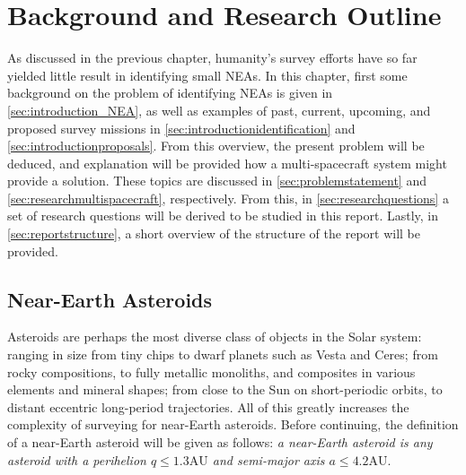 \chapter{Background and Research Outline}
As discussed in the previous chapter, humanity's survey efforts have so far yielded little result in identifying small NEAs. In this chapter, first some background on the problem of identifying NEAs is given in \autoref{sec:introduction_NEA}, as well as examples of past, current, upcoming, and proposed survey missions in \autoref{sec:introductionidentification} and \autoref{sec:introductionproposals}. From this overview, the present problem will be deduced, and explanation will be provided how a multi-spacecraft system might provide a solution. These topics are discussed in \autoref{sec:problemstatement} and \autoref{sec:researchmultispacecraft}, respectively. From this, in \autoref{sec:researchquestions} a set of research questions will be derived to be studied in this report. Lastly, in \autoref{sec:reportstructure}, a short overview of the structure of the report will be provided.

\section{Near-Earth Asteroids}
\label{sec:introduction_NEA}
Asteroids are perhaps the most diverse class of objects in the Solar system: ranging in size from tiny chips to dwarf planets such as Vesta and Ceres; from rocky compositions, to fully metallic monoliths, and composites in various elements and mineral shapes; from close to the Sun on short-periodic orbits, to distant eccentric long-period trajectories. All of this greatly increases the complexity of surveying for near-Earth asteroids. Before continuing, the definition of a near-Earth asteroid will be given as follows: \textit{a near-Earth asteroid is any asteroid with a perihelion $q \leq 1.3 \mathrm{AU}$ and semi-major axis $a \leq 4.2 \mathrm{AU}$}. \\

